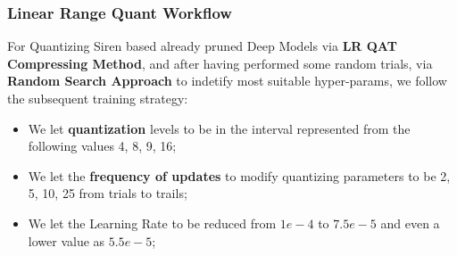 



\begin{frame}
    \frametitle{Linear Range Quant Workflow}
        For Quantizing Siren based already pruned Deep Models via \textbf{LR QAT Compressing Method}, and after having performed some random trials,
        via \textbf{Random Search Approach} to indetify most suitable hyper-params, we follow the subsequent training strategy:
        \begin{itemize}
            \item We let \textbf{quantization} levels to be in the interval represented from the following values {4, 8, 9, 16};
            \item We let the \textbf{frequency of updates} to modify quantizing parameters to be {2, 5, 10, 25} from trials to trails; 
            \item We let the Learning Rate to be reduced from $1e-4$ to $7.5e-5$ and even a lower value as $5.5e-5$;
        \end{itemize}
\end{frame}
